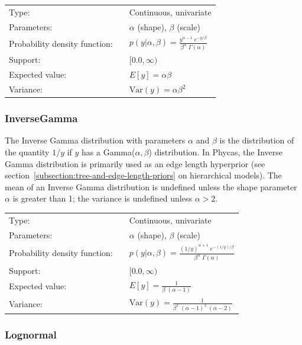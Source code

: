 \documentclass[10pt]{article}
\newcommand{\Var}{\mbox{Var}}
\newcommand{\phycas}{{\sc Phycas}\index{Phycas}}
\begin{document}
\begin{tabular}{lcl}
Type:                 & & Continuous, univariate \\
Parameters:           & & $\alpha$ (shape), $\beta$ (scale)    \\
Probability density function: & & $p(y|\alpha,\beta) = \frac{y^{\alpha - 1} \; e^{-y/\beta}}{\beta^{\alpha} \; \Gamma(\alpha)}$ \\
Support:              & & $[0.0,\infty)$     \\
Expected value:       & & $E[y] = \alpha \beta$ \\
Variance:             & & $\Var(y) = \alpha \beta^2$ 
\end{tabular}

\subsubsection{InverseGamma}

The Inverse Gamma distribution with parameters $\alpha$ and $\beta$ is the distribution of the quantity $1/y$ if $y$ has a Gamma($\alpha,\beta$) distribution. In \phycas, the Inverse Gamma distribution is primarily used as an edge length hyperprior (see section~\ref{subsection:tree-and-edge-length-priors} on hierarchical models). The mean of an Inverse Gamma distribution is undefined unless the shape parameter $\alpha$ is greater than 1; the variance is undefined unless $\alpha > 2$.

\begin{tabular}{lcl}
Type:                 & & Continuous, univariate \\
Parameters:           & & $\alpha$ (shape), $\beta$ (scale)    \\
Probability density function: & & $p(y|\alpha,\beta) = \frac{(1/y)^{\alpha + 1} \; e^{-(1/y)/\beta}}{\beta^{\alpha} \; \Gamma(\alpha)}$ \\
Support:              & & $[0.0,\infty)$     \\
Expected value:       & & $E[y] = \frac{1}{\beta \;(\alpha-1)}$ \\
Variance:             & & $\Var(y) = \frac{1}{\beta^2 \; (\alpha-1)^2 \; (\alpha-2)}$ 
\end{tabular}

\subsubsection{Lognormal}
\end{document}
